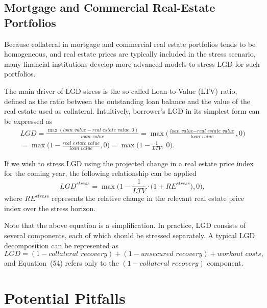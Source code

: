 \documentclass[11pt,a4paper]{article}
\begin{document}
\subsection{Mortgage and Commercial Real-Estate Portfolios}

Because collateral in mortgage and commercial real estate portfolios tends to be homogeneous, and real estate prices are typically included in the stress scenario, many financial institutions develop more advanced models to stress LGD for such portfolios.

The main driver of LGD stress is the so-called Loan-to-Value (LTV) ratio, defined as the ratio between the outstanding loan balance and the value of the real estate used as collateral. Intuitively, borrower's LGD in its simplest form can be expressed as
\begin{multline}
LGD = \frac{\max(\textit{loan value} - \textit{real estate value}, 0)}{\textit{loan value}} 
= \max\Bigg( \frac{\textit{loan value} - \textit{real estate value}}{\textit{loan value}}, 0 \Bigg) \\ 
= \max\Bigg( 1 - \frac{\textit{real estate value}}{\textit{loan value}}, 0 \Bigg) 
= \max\Bigg( 1 - \frac{1}{LTV},\, 0 \Bigg).
\end{multline}

If we wish to stress LGD using the projected change in a real estate price index for the coming year, the following relationship can be applied
\begin{equation}
LGD^{\textit{stress}} = \max\Bigg( 1 - \frac{1}{LTV} \cdot \Big(1 + RE^{\textit{stress}} \Big), 0 \Bigg),
\end{equation}
where $RE^{\textit{stress}}$ represents the relative change in the relevant real estate price index over the stress horizon.

Note that the above equation is a simplification. In practice, LGD consists of several components, each of which should be stressed separately. A typical LGD decomposition can be represented as
\begin{equation}
LGD = (1 - \textit{collateral recovery}) + (1 - \textit{unsecured recovery}) + \textit{workout costs},
\end{equation}
and Equation~(54) refers only to the $(1 - \textit{collateral recovery})$ component.

\section{Potential Pitfalls}
\end{document}
